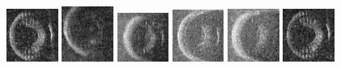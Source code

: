 \begin{figure}
    \includegraphics[width=0.15\textwidth]{chapters/images/dataset/all-class-images/tire/tire-259.jpg}
    \includegraphics[width=0.15\textwidth]{chapters/images/dataset/all-class-images/tire/tire-50.jpg}
    \includegraphics[width=0.15\textwidth]{chapters/images/dataset/all-class-images/tire/tire-134.jpg}
    \includegraphics[width=0.15\textwidth]{chapters/images/dataset/all-class-images/tire/tire-7.jpg}
    \includegraphics[width=0.15\textwidth]{chapters/images/dataset/all-class-images/tire/tire-19.jpg}
    \includegraphics[width=0.15\textwidth]{chapters/images/dataset/all-class-images/tire/tire-301.jpg}
    

\end{figure}
